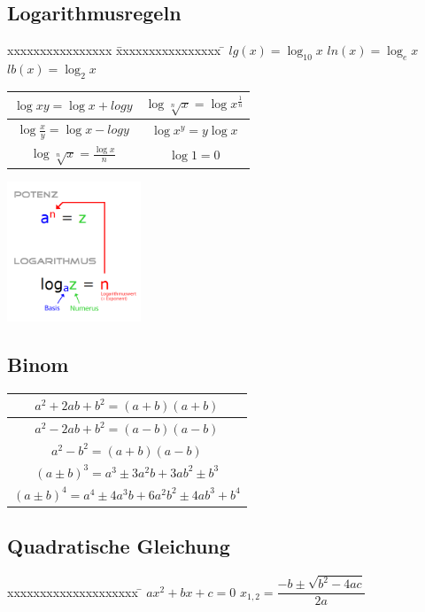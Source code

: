 \subsection{Logarithmusregeln}
\begin{minipage}{10cm}
	\begin{tabbing}
		xxxxxxxxxxxxxxxx \= xxxxxxxxxxxxxxxx \= \kill
		$lg(x) = \log_{10} x$ \> $ln(x) = \log_{e} x$ \> $lb(x) = \log_{2} x$
	\end{tabbing}
	\renewcommand{\arraystretch}{2}
	\begin{tabular}{|c|c|}
		\hline $\log{xy} = \log{x} + log{y}$ & $\log{\sqrt[n]{x}}=\log{x^\frac{1}{n}}$\\
		\hline $\log{\frac{x}{y}}= \log{x} - log{y}$ & $\log{x^y}= y\log{x}$ \\
		\hline $\log{\sqrt[n]{x}}= \frac{\log{x}}{n}$ & $\log{1}=0$\\
		\hline
	\end{tabular}
\end{minipage}
\begin{minipage}{5cm}
	\includegraphics[width=4cm]{images/potenz_logarithmus.png}	
\end{minipage}

\begin{multicols}{2}
	\subsection{Binom}
	\renewcommand{\arraystretch}{2}
	\begin{tabular}{|c|}
		\hline $a^2+2ab+b^2 = (a+b)(a+b)$\\
		\hline $a^2-2ab+b^2 = (a-b)(a-b)$\\
		\hline $a^2-b^2= (a+b)(a-b)$\\
		\hline $(a \pm b)^3 =a^3 \pm  3 a^{2} b + 3 a b^2 \pm b^3 $\\
		\hline $(a \pm b)^4 =a^4 \pm  4 a^{3} b + 6a^2b^2 \pm 4 a b^3 +	b^4$\\
		\hline
	\end{tabular}
	
	\subsection{Quadratische Gleichung}
	\begin{tabbing}
		xxxxxxxxxxxxxxxxxxxx \= \kill
		$ax^2+bx+c=0$ \> $x_{1,2} = \dfrac{-b \pm \sqrt{b^2 - 4ac}}{2a}$
	\end{tabbing}
\end{multicols}
\clearpage
\pagebreak
